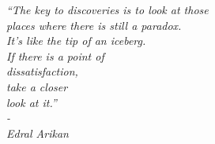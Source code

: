 \vfill	

\begin{center}
\vfill
\singlespacing
\emph{``The key to discoveries is to look at those\\
 places where there is still a paradox.\\
It’s like the tip of an iceberg.\\
If there is a point of \\
dissatisfaction, \\
take a closer \\
look at it.'' \\-\\
\emph{Edral Arikan}}
 \end{center}


 



	








	








	



